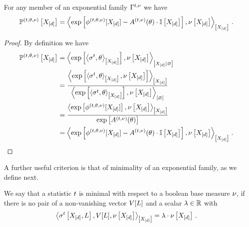 \begin{lemma}
    \label{lem:energyCumulantRepresentation}
    For any member of an exponential family $\Gamma^{t,\nu}$ we have
    \begin{align*}
        \mathbb{P}^{(t,\theta,\nu)}\left[X_{[d]}\right]
        = \left\langle \mathrm{exp}\left[ \phi^{(t,\theta,\nu)}[X_{[d]}] - A^{(t,\nu)}(\theta)\cdot \mathbb{I}\left[X_{[d]}\right]\right],\nu\left[X_{[d]}\right]\right\rangle_{\left[ X_{[d]} \right]} \, .
    \end{align*}
\end{lemma}
\begin{proof}
    By definition we have
    \begin{align*}
        \mathbb{P}^{(t,\theta,\nu)}\left[X_{[d]}\right]
        &= \left\langle 
            \mathrm{exp}\left[\left\langle \sigma^{t},\theta\right\rangle_{\left[ X_{[d]} \right]}\right],\nu\left[X_{[d]}\right]
        \right\rangle_{\left[ X_{[d]} | \varnothing \right]} \\
        &= \frac{\left\langle \mathrm{exp}\left[\left\langle \sigma^{t},\theta\right\rangle_{\left[ X_{[d]} \right]},\nu\left[X_{[d]}\right]\right]\right\rangle_{\left[ X_{[d]} \right]}
        }{\left\langle \mathrm{exp}\left[\left\langle \sigma^{t},\theta    \right\rangle_{\left[ X_{[d]} \right]}\right],\nu\left[X_{[d]}\right]\right\rangle_{\left[ \varnothing \right]}} \\
        &=  \frac{
            \left\langle \mathrm{exp}\left[\phi^{(t,\theta,\nu)}[X_{[d]}]\right],\nu\left[X_{[d]}\right]\right\rangle_{\left[ X_{[d]} \right]}
        }{
            \mathrm{exp}\left[A^{(t,\nu)}(\theta)\right]
        } \\
        & = \left\langle \mathrm{exp}\left[ \phi^{(t,\theta,\nu)}[X_{[d]}] - A^{(t,\nu)}(\theta)\cdot \mathbb{I}\left[X_{[d]}\right]\right],\nu\left[X_{[d]}\right]\right\rangle_{\left[ X_{[d]} \right]} \, . \qedhere
    \end{align*}
\end{proof}


A further useful criterion is that of minimality of an exponential family, as we define next.

\begin{definition}
    \label{def:minimalStatistics}
    We say that a statistic $t$ is minimal with respect to a boolean base measure $\nu$, if there is no pair of a non-vanishing vector $V[L]$ and a scalar $\lambda\in\mathbb{R}$ with
    \begin{align*}
        \left\langle \sigma^{t}\left[X_{[d]},L\right],V[L],\nu\left[X_{[d]}\right]\right\rangle_{\left[ X_{[d]} \right]} = \lambda\cdot\nu\left[X_{[d]}\right] \, .
    \end{align*}
\end{definition}

